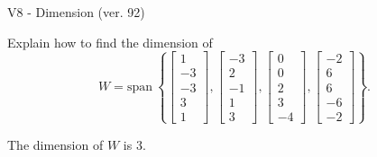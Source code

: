 \begin{exercise}
  \begin{exerciseTitle}V8 - Dimension (ver. 92)\end{exerciseTitle}
  \begin{exerciseStatement}
    Explain how to find the dimension of 
\[W=\mathrm{span}\ \left\{\left[\begin{array}{r}
1 \\
-3 \\
-3 \\
3 \\
1
\end{array}\right] , \left[\begin{array}{r}
-3 \\
2 \\
-1 \\
1 \\
3
\end{array}\right] , \left[\begin{array}{r}
0 \\
0 \\
2 \\
3 \\
-4
\end{array}\right] , \left[\begin{array}{r}
-2 \\
6 \\
6 \\
-6 \\
-2
\end{array}\right]\right\}.\]



  \end{exerciseStatement}
  \begin{exerciseAnswer}
   The dimension of \(W\) is  \(3\).
  


  \end{exerciseAnswer}
\end{exercise}